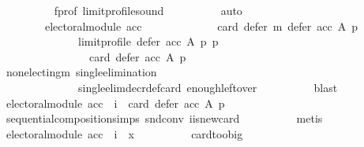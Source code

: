 \begin{isabellebody}
\ \ \ \ \ \ \ \ \isamarkupfalse%
\ f{\isacharunderscore}{\kern0pt}prof\ limit{\isacharunderscore}{\kern0pt}profile{\isacharunderscore}{\kern0pt}sound\isanewline
\ \ \ \ \ \ \ \ \isamarkupfalse%
\ auto\isanewline
\ \ \ \ \ \ \isamarkupfalse%
\isanewline
\ \ \ \ \ \ \ \ {\isachardoublequoteopen}electoral{\isacharunderscore}{\kern0pt}module\ acc\ {\isasymlongrightarrow}\isanewline
\ \ \ \ \ \ \ \ \ \ \ \ card\ {\isacharparenleft}{\kern0pt}defer\ m\ {\isacharparenleft}{\kern0pt}defer\ acc\ A\ p{\isacharparenright}{\kern0pt}\isanewline
\ \ \ \ \ \ \ \ \ \ \ \ \ \ {\isacharparenleft}{\kern0pt}limit{\isacharunderscore}{\kern0pt}profile\ {\isacharparenleft}{\kern0pt}defer\ acc\ A\ p{\isacharparenright}{\kern0pt}\ p{\isacharparenright}{\kern0pt}{\isacharparenright}{\kern0pt}\ {\isacharequal}{\kern0pt}\isanewline
\ \ \ \ \ \ \ \ \ \ \ \ \ \ \ \ card\ {\isacharparenleft}{\kern0pt}defer\ acc\ A\ p{\isacharparenright}{\kern0pt}\ {\isacharminus}{\kern0pt}\ {}{\isachardoublequoteclose}\isanewline
\ \ \ \ \ \ \ \ \isamarkupfalse%
\ non{\isacharunderscore}{\kern0pt}electing{\isacharunderscore}{\kern0pt}m\ single{\isacharunderscore}{\kern0pt}elimination\isanewline
\ \ \ \ \ \ \ \ \ \ \ \ \ \ single{\isacharunderscore}{\kern0pt}elim{\isacharunderscore}{\kern0pt}decr{\isacharunderscore}{\kern0pt}def{\isacharunderscore}{\kern0pt}card{}\ enough{\isacharunderscore}{\kern0pt}leftover\isanewline
\ \ \ \ \ \ \ \ \isamarkupfalse%
\ blast\isanewline
\ \ \ \ \ \ \isamarkupfalse%
\ {\isachardoublequoteopen}electoral{\isacharunderscore}{\kern0pt}module\ acc\ {\isasymlongrightarrow}\ i\ {\isacharequal}{\kern0pt}\ card\ {\isacharparenleft}{\kern0pt}defer\ acc\ A\ p{\isacharparenright}{\kern0pt}\ {\isacharminus}{\kern0pt}\ {}{\isachardoublequoteclose}\isanewline
\ \ \ \ \ \ \ \ \isamarkupfalse%
\ sequential{\isacharunderscore}{\kern0pt}composition{\isachardot}{\kern0pt}simps\ snd{\isacharunderscore}{\kern0pt}conv\ i{\isacharunderscore}{\kern0pt}is{\isacharunderscore}{\kern0pt}new{\isacharunderscore}{\kern0pt}card\isanewline
\ \ \ \ \ \ \ \ \isamarkupfalse%
\ metis\isanewline
\ \ \ \ \ \ \isamarkupfalse%
\ {\isachardoublequoteopen}electoral{\isacharunderscore}{\kern0pt}module\ acc\ {\isasymlongrightarrow}\ i\ {\isasymge}\ x{\isachardoublequoteclose}\isanewline
\ \ \ \ \ \ \ \ \isamarkupfalse%
\ card{\isacharunderscore}{\kern0pt}too{\isacharunderscore}{\kern0pt}big\isanewline
\ \ \ \ \ \ \ \ \isamarkupfalse%

\end{isabellebody}
